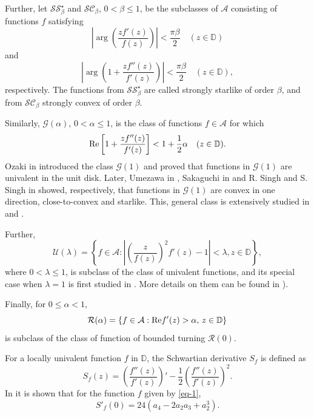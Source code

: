 \documentclass{amsart}
\newcommand{\A}{{\mathcal A}}
\newcommand{\U}{{\mathcal U}}
\newcommand{\ID}{{\mathbb D}}
\begin{document}
\medskip

Further, let  $\mathcal{S}\mathcal{S}^{\star}_{\beta}$ and  $\mathcal{S}\mathcal{C}_{\beta}$, $0<\beta\le1$,
be the subclasses of $\mathcal{A}$ consisting of functions $f$ satisfying
\[
\left|\arg \left(\frac{zf'(z)}{f(z)}\right)\right|<\frac{\pi\beta}{2}\quad (z\in \ID)
\]
and
\[
\left|\arg \left(1+\frac{zf''(z)}{f'(z)}\right)\right|<\frac{\pi\beta}{2}\quad (z\in \ID),
\]
respectively. The functions from $\mathcal{S}\mathcal{S}^{\star}_{\beta}$ are called strongly starlike of order $\beta$, and from $\mathcal{S}\mathcal{C}_{\beta}$
strongly convex of order $\beta$.

\medskip

Similarly, $\mathcal{G}(\alpha)$, $0<\alpha\leq 1$, is the class of functions $f\in \mathcal{A}$ for which
\[
{\rm Re}\left[1+\frac{zf''(z)}{f'(z)}\right] <1+\frac{1}{2}\alpha \quad (z\in\ID).
\]
Ozaki in \cite{ozaki-1941} introduced the class $\mathcal{G}(1)$ and proved that functions in $\mathcal{G}(1)$ are univalent in the unit disk. Later, Umezawa in \cite{umezawa}, Sakaguchi in \cite{saka} and R. Singh and S. Singh in \cite{singh} showed, respectively,  that functions in $\mathcal{G}(1)$ are convex in one direction, close-to-convex and starlike. This, general class is extensively studied  in  \cite{MO-1995} and \cite{MO-2013}.

\medskip

Further,
\[
\U(\lambda) = \left\{ f\in\A: \left|\left(\frac{z}{f(z)}\right)^2f'(z)-1\right| < \lambda, z\in\ID  \right\},
\]
where $0<\lambda\le1$, is subclass of the class of univalent functions, and its special case when $\lambda=1$ is first studied in \cite{Japonica_1996}. More details on them can be found in \cite{obpon-1,obpon-2,TTV}).

\medskip

Finally, for $0\leq \alpha<1$,
\[
\mathcal{R}(\alpha)=\left\{f\in\mathcal{A}: {\rm Re}f'(z)>\alpha,\, z\in\ID \right\}
\]
is subclass of the class of function of bounded turning $\mathcal{R}(0)$.

\medskip

For a locally univalent function $f$ in $\ID$, the Schwartian derivative $S_{f}$ is defined as
\[
S_{f}(z)= \left(\frac{f''(z)}{f'(z)}\right)'-\frac{1}{2}\left(\frac{f''(z)}{f'(z)}\right)^{2}.
\]
In \cite{QW} it is shown that for the function $f$ given by \eqref{eq-1},
\begin{equation}\label{eq-2}
S'_{f}(0)=24(a_{4}-2a_{2}a_{3}+a_{2}^{3}).
\end{equation}
\end{document}
